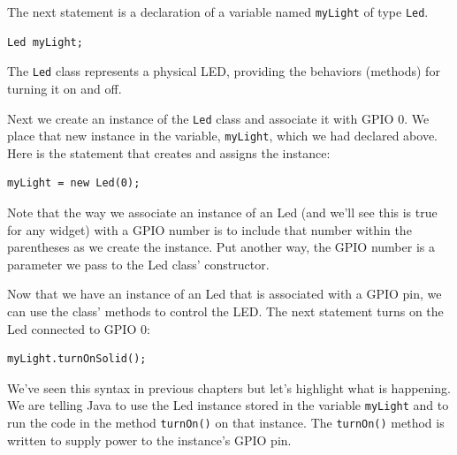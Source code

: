 
The next statement is a declaration of a variable named \texttt{myLight} of type \texttt{Led}. 

\beforeverb
\begin{verbatim}
Led myLight;
\end{verbatim}
\afterverb

The \texttt{Led} class represents a physical LED, providing the behaviors (methods) for turning it on and off.

Next we create an instance of the \texttt{Led} class and associate it with GPIO 0. We place that new instance in the variable, \texttt{myLight}, which we had declared above. Here is the statement that creates and assigns the instance:

\beforeverb
\begin{verbatim}
myLight = new Led(0);
\end{verbatim}
\afterverb

Note that the way we associate an instance of an Led (and we'll see this is true for any widget) with a GPIO number is to include that number within the parentheses as we create the instance. Put another way, the GPIO number is a parameter we pass to the Led class' constructor.

Now that we have an instance of an Led that is associated with a GPIO pin, we can use the class' methods to control the LED. The next statement turns on the Led connected to GPIO 0:

\beforeverb
\begin{verbatim}
myLight.turnOnSolid();
\end{verbatim}
\afterverb

We've seen this syntax in previous chapters but let's highlight what is happening. We are telling Java to use the Led instance stored in the variable \texttt{myLight} and to run the code in the method \texttt{turnOn()} on that instance. The \texttt{turnOn()} method is written to supply power to the instance's GPIO pin.

